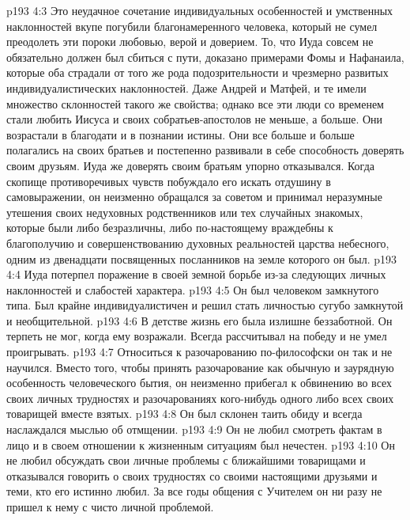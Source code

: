 \vs p193 4:3 Это неудачное сочетание индивидуальных особенностей и умственных наклонностей вкупе погубили благонамеренного человека, который не сумел преодолеть эти пороки любовью, верой и доверием. То, что Иуда совсем не обязательно должен был сбиться с пути, доказано примерами Фомы и Нафанаила, которые оба страдали от того же рода подозрительности и чрезмерно развитых индивидуалистических наклонностей. Даже Андрей и Матфей, и те имели множество склонностей такого же свойства; однако все эти люди со временем стали любить Иисуса и своих собратьев\hyp{}апостолов не меньше, а больше. Они возрастали в благодати и в познании истины. Они все больше и больше полагались на своих братьев и постепенно развивали в себе способность доверять своим друзьям. Иуда же доверять своим братьям упорно отказывался. Когда скопище противоречивых чувств побуждало его искать отдушину в самовыражении, он неизменно обращался за советом и принимал неразумные утешения своих недуховных родственников или тех случайных знакомых, которые были либо безразличны, либо по\hyp{}настоящему враждебны к благополучию и совершенствованию духовных реальностей царства небесного, одним из двенадцати посвященных посланников на земле которого он был.
\vs p193 4:4 Иуда потерпел поражение в своей земной борьбе из\hyp{}за следующих личных наклонностей и слабостей характера.
\vs p193 4:5 \bibnobreakspace Он был человеком замкнутого типа. Был крайне индивидуалистичен и решил стать личностью сугубо замкнутой и необщительной.
\vs p193 4:6 \bibnobreakspace В детстве жизнь его была излишне беззаботной. Он терпеть не мог, когда ему возражали. Всегда рассчитывал на победу и не умел проигрывать.
\vs p193 4:7 \bibnobreakspace Относиться к разочарованию по\hyp{}философски он так и не научился. Вместо того, чтобы принять разочарование как обычную и заурядную особенность человеческого бытия, он неизменно прибегал к обвинению во всех своих личных трудностях и разочарованиях кого\hyp{}нибудь одного либо всех своих товарищей вместе взятых.
\vs p193 4:8 \bibnobreakspace Он был склонен таить обиду и всегда наслаждался мыслью об отмщении.
\vs p193 4:9 \bibnobreakspace Он не любил смотреть фактам в лицо и в своем отношении к жизненным ситуациям был нечестен.
\vs p193 4:10 \bibnobreakspace Он не любил обсуждать свои личные проблемы с ближайшими товарищами и отказывался говорить о своих трудностях со своими настоящими друзьями и теми, кто его истинно любил. За все годы общения с Учителем он ни разу не пришел к нему с чисто личной проблемой.
